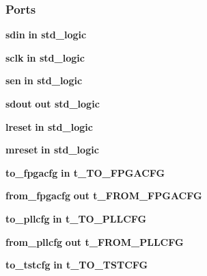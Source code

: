 \subsubsection*{Ports}
 \begin{DoxyCompactItemize}
\item 
{\bf sdin}  {\bfseries {\bfseries \textcolor{keywordflow}{in}\textcolor{vhdlchar}{ }}} {\bfseries \textcolor{comment}{std\+\_\+logic}\textcolor{vhdlchar}{ }} 
\item 
{\bf sclk}  {\bfseries {\bfseries \textcolor{keywordflow}{in}\textcolor{vhdlchar}{ }}} {\bfseries \textcolor{comment}{std\+\_\+logic}\textcolor{vhdlchar}{ }} 
\item 
{\bf sen}  {\bfseries {\bfseries \textcolor{keywordflow}{in}\textcolor{vhdlchar}{ }}} {\bfseries \textcolor{comment}{std\+\_\+logic}\textcolor{vhdlchar}{ }} 
\item 
{\bf sdout}  {\bfseries {\bfseries \textcolor{keywordflow}{out}\textcolor{vhdlchar}{ }}} {\bfseries \textcolor{comment}{std\+\_\+logic}\textcolor{vhdlchar}{ }} 
\item 
{\bf lreset}  {\bfseries {\bfseries \textcolor{keywordflow}{in}\textcolor{vhdlchar}{ }}} {\bfseries \textcolor{comment}{std\+\_\+logic}\textcolor{vhdlchar}{ }} 
\item 
{\bf mreset}  {\bfseries {\bfseries \textcolor{keywordflow}{in}\textcolor{vhdlchar}{ }}} {\bfseries \textcolor{comment}{std\+\_\+logic}\textcolor{vhdlchar}{ }} 
\item 
{\bf to\+\_\+fpgacfg}  {\bfseries {\bfseries \textcolor{keywordflow}{in}\textcolor{vhdlchar}{ }}} {\bfseries {\bfseries {\bf t\+\_\+\+T\+O\+\_\+\+F\+P\+G\+A\+C\+FG}} \textcolor{vhdlchar}{ }} 
\item 
{\bf from\+\_\+fpgacfg}  {\bfseries {\bfseries \textcolor{keywordflow}{out}\textcolor{vhdlchar}{ }}} {\bfseries {\bfseries {\bf t\+\_\+\+F\+R\+O\+M\+\_\+\+F\+P\+G\+A\+C\+FG}} \textcolor{vhdlchar}{ }} 
\item 
{\bf to\+\_\+pllcfg}  {\bfseries {\bfseries \textcolor{keywordflow}{in}\textcolor{vhdlchar}{ }}} {\bfseries {\bfseries {\bf t\+\_\+\+T\+O\+\_\+\+P\+L\+L\+C\+FG}} \textcolor{vhdlchar}{ }} 
\item 
{\bf from\+\_\+pllcfg}  {\bfseries {\bfseries \textcolor{keywordflow}{out}\textcolor{vhdlchar}{ }}} {\bfseries {\bfseries {\bf t\+\_\+\+F\+R\+O\+M\+\_\+\+P\+L\+L\+C\+FG}} \textcolor{vhdlchar}{ }} 
\item 
{\bf to\+\_\+tstcfg}  {\bfseries {\bfseries \textcolor{keywordflow}{in}\textcolor{vhdlchar}{ }}} {\bfseries {\bfseries {\bf t\+\_\+\+T\+O\+\_\+\+T\+S\+T\+C\+FG}} \textcolor{vhdlchar}{ }} 

\end{DoxyCompactItemize}
